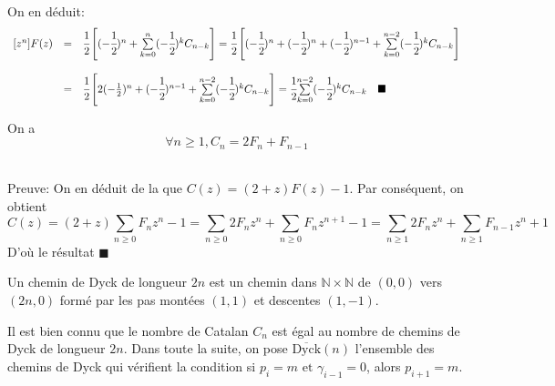\text{}\vspace{5pt}\\
On en déduit:
\[
	\begin{array}{c c l}
		[z^n]F(z) & =       & \cfrac{1}{2}\left[(-\cfrac{1}{2})^n + \underset{k=0}{\overset{n}{\sum}}(-\cfrac{1}{2})^k C_{n-k}
			\right]=\cfrac{1}{2}\left[(-\cfrac{1}{2})^n + (-\cfrac{1}{2})^n +(-\cfrac{1}{2})^{n-1} +\underset{k=0}
		{\overset{n-2}{\sum}}(-\cfrac{1}{2})^k C_{n-k}\right]                                                                    \\
		          & \text{} &                                                                                                    \\
		          & =       & \cfrac{1}{2}\left[2(-\frac{1}{2})^n + (-\cfrac{1}{2})^{n-1} +\underset{k=0}{\overset{n-2}{\sum}}(-
			\cfrac{1}{2})^k C_{n-k}\right]=\cfrac{1}{2}\underset{k=0}{\overset{n-2}{\sum}}(-\cfrac{1}{2})^k C_{n-k}
		\hspace{10pt}\blacksquare
	\end{array}
\]
\text{}\vspace{5pt}
\begin{proposition}\label{cnfn}
	On a \[\forall n\geq 1, C_{n}=2F_{n}+F_{n-1}\]
\end{proposition}
\text{}\\
Preuve:
On en déduit de la  que $C(z)=(2+z)F(z)-1$. Par conséquent, on obtient
\[C(z)= (2+z)\underset{n\geq0}{\sum}F_{n}z^n -1=\sum_{n\geq 0}2F_{n}z^n+\sum_{n\geq 0} F_{n}
	z^{n+1}-1=\sum_{n\geq 1}2F_{n}z^n+\sum_{n\geq 1} F_{n-1}z^{n}+1\]
D'où le résultat \hspace{5pt}$\blacksquare$ \vspace{5pt}\\
\begin{definition}
	\begin{rm}
		Un chemin de Dyck de longueur $2n$ est un chemin dans $\mathbb{N}\times \mathbb{N}$ de $(0, 0)$ vers $(2n, 0)$ formé par les pas montées $(1,1)$
		et descentes $(1,-1)$.
	\end{rm}
\end{definition}
Il est bien connu que le nombre de Catalan $C_{n}$ est égal au nombre de chemins de Dyck
de longueur $2n$. Dans toute la suite, on pose $\overline{\text{Dyck}}(n)$ l'ensemble des chemins de Dyck qui
vérifient la condition si $p_{i}=m \text{ et } \gamma_{i-1}=0$, alors  $p_{i+1}=m$.

